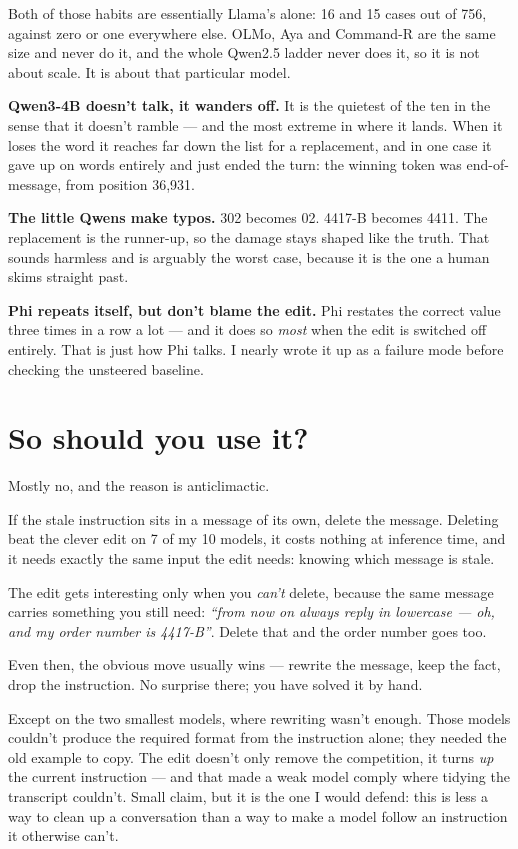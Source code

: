 \documentclass[11pt,a4paper]{article}
\begin{document}
Both of those habits are essentially Llama's alone: 16 and 15 cases out of 756,
against zero or one everywhere else. OLMo, Aya and Command-R are the same size
and never do it, and the whole Qwen2.5 ladder never does it, so it is not about
scale. It is about that particular model.

\textbf{Qwen3-4B doesn't talk, it wanders off.} It is the quietest of the ten in
the sense that it doesn't ramble --- and the most extreme in where it lands. When
it loses the word it reaches far down the list for a replacement, and in one case
it gave up on words entirely and just ended the turn: the winning token was
end-of-message, from position 36{,}931.

\textbf{The little Qwens make typos.} 302 becomes 02. 4417-B becomes 4411. The
replacement is the runner-up, so the damage stays shaped like the truth. That
sounds harmless and is arguably the worst case, because it is the one a human
skims straight past.

\textbf{Phi repeats itself, but don't blame the edit.} Phi restates the correct
value three times in a row a lot --- and it does so \emph{most} when the edit is
switched off entirely. That is just how Phi talks. I nearly wrote it up as a
failure mode before checking the unsteered baseline.

\section*{So should you use it?}

Mostly no, and the reason is anticlimactic.

If the stale instruction sits in a message of its own, delete the message.
Deleting beat the clever edit on 7 of my 10 models, it costs nothing at inference
time, and it needs exactly the same input the edit needs: knowing which message
is stale.

The edit gets interesting only when you \emph{can't} delete, because the same
message carries something you still need: \emph{``from now on always reply in
lowercase --- oh, and my order number is 4417-B''}. Delete that and the order
number goes too.

Even then, the obvious move usually wins --- rewrite the message, keep the fact,
drop the instruction. No surprise there; you have solved it by hand.

Except on the two smallest models, where rewriting wasn't enough. Those models
couldn't produce the required format from the instruction alone; they needed the
old example to copy. The edit doesn't only remove the competition, it turns
\emph{up} the current instruction --- and that made a weak model comply where
tidying the transcript couldn't. Small claim, but it is the one I would defend:
this is less a way to clean up a conversation than a way to make a model follow
an instruction it otherwise can't.
\end{document}
